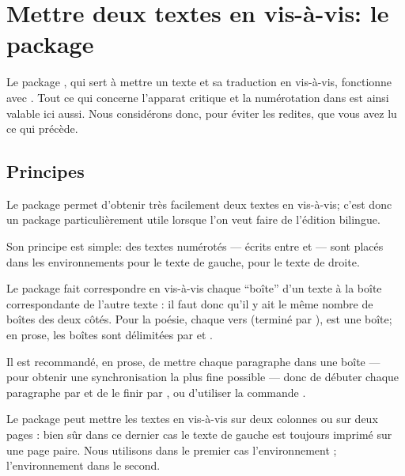 






\section{Mettre deux textes en vis-à-vis: le package }


Le package , qui sert à mettre un texte et sa traduction en vis-à-vis, fonctionne avec . Tout ce qui concerne l'apparat critique et la numérotation dans  est ainsi valable ici aussi. Nous considérons donc, pour éviter les redites, que vous avez lu ce qui précède.



\subsection{Principes}

Le package  permet d'obtenir très facilement deux textes en vis-à-vis; c'est donc un package particulièrement utile lorsque l'on veut faire de l'édition bilingue.

Son principe est simple:  des textes numérotés  --- écrits entre  et   --- sont placés dans les environnements  pour le texte de gauche,   pour le texte de droite.

Le package  fait correspondre en vis-à-vis chaque \enquote{boîte} d'un texte à la boîte correspondante de l'autre texte : il faut donc qu'il y ait le même nombre de boîtes des deux côtés. Pour la poésie,  chaque vers  (terminé par \ampersand ), est une boîte;  en prose, les boîtes sont délimitées par   et  .  

Il est recommandé, en prose, de mettre chaque paragraphe dans une boîte --- pour obtenir une synchronisation la plus fine possible --- donc de débuter chaque paragraphe par  et de le finir par , ou d'utiliser la commande . 


Le package  peut mettre les textes en vis-à-vis sur deux colonnes ou sur deux pages  : bien sûr dans ce dernier  cas le texte de gauche est toujours imprimé sur une page paire.
Nous utilisons dans le premier cas l'environnement  ; l'environnement  dans le second.

